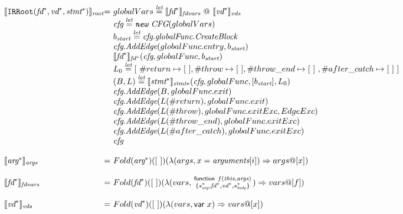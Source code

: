 \[
\begin{array}{l@{}l@{~}l}

\transfun{\TT{IRRoot}(\emph{fd}^*, \emph{vd}^*, \emph{stmt}^*)}_{\emph{root}}
& = & globalVars \letval \transfun{\emph{fd}^*}_{\emph{fdvars}} ~@~ \transfun{\emph{vd}^*}_{\emph{vds}} \\
& & \emph{cfg} \letval \emph{\TT{new}\ CFG}(globalVars)\\
& & b_{\emph{start}} \letval \emph{cfg}.\emph{globalFunc}.\emph{CreateBlock}\\
& & \emph{cfg}.\emph{AddEdge}(globalFunc.entry, b_{\emph{start}})\\
& & \transfun{\emph{fd}^*}_{\emph{fd}^*}(\emph{cfg}, globalFunc, b_{\emph{start}})\\
& & L_0 \letval [\ \#return \mapsto [\ ], \#throw \mapsto [\ ] , \#throw\_end \mapsto [\ ]\ , \#after\_catch \mapsto [\ ]\ ] \\
& & (B, L) \letval \transfun{\emph{stmt}^*}_{\emph{stmt}*}(\emph{cfg}, globalFunc, [b_{\emph{start}}], L_0)\\
& & \emph{cfg}.\emph{AddEdge}(B, globalFunc.exit)\\
& & \emph{cfg}.\emph{AddEdge}(L(\#return), globalFunc.exit)\\
& & \emph{cfg}.\emph{AddEdge}(L(\#throw), globalFunc.exitExc, EdgeExc)\\
& & \emph{cfg}.\emph{AddEdge}(L(\#throw\_end), globalFunc.exitExc)\\
& & \emph{cfg}.\emph{AddEdge}(L(\#after\_catch), globalFunc.exitExc)\\
& & \emph{cfg}\\
& & \\

\transfun{\emph{arg}^*}_{\emph{args}} & = &
Fold(\emph{arg}^*)([\ ])(\lambda(args, x = \emph{arguments}[i])\Rightarrow args @ [x])\\
& & \\

\transfun{\emph{fd}^*}_{\emph{fdvars}} & = &
Fold(\emph{fd}^*)([\ ])(\lambda(vars, \irfundeclsmall{f}{\emph{this}}{\emph{args}}{s_{\emph{arg}}^*}{\emph{fd}^*}{\emph{vd}^*}{s_{\emph{body}}^*})\Rightarrow vars @ [f])\\
& & \\

\transfun{\emph{vd}^*}_{\emph{vds}} & = &
Fold(\emph{vd}^*)([\ ])(\lambda(vars, \irvar{x})\Rightarrow vars @ [x])\\
& & \\


\end{array}\]
